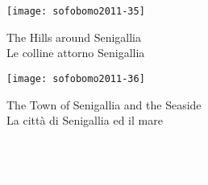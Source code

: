 \begin{center}
\clearpage{\pagestyle{empty}\cleardoublepage}

\pagestyle{plain}

\texttt{[image: sofobomo2011-35]}

{The Hills around Senigallia}\\
{\footnotesize Le colline attorno Senigallia}
\vspace*{\fill}
\newpage

\texttt{[image: sofobomo2011-36]}

{The Town of Senigallia and the Seaside}\\
{\footnotesize La città di Senigallia ed il mare}
\vspace*{\fill}
\newpage

\end{center}

\pagecolor{MyGray}
\pagestyle{empty}
\vspace*{2in}

\hfill{\textsf{\textcolor{white}{\Huge Colophon}}}

\hfill{\textsf{\textcolor{white}{\LARGE Colofone}}}

\clearpage{\pagestyle{empty}\cleardoublepage}

\pagecolor{white}
\pagestyle{plain}

